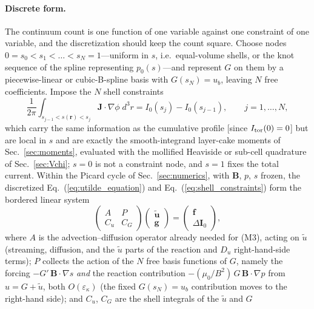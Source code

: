 \documentclass[english]{article}
\newcommand{\bB}{\mathbf{B}}
\newcommand{\bJ}{\mathbf{J}}
\newcommand{\br}{\mathbf{r}}
\begin{document}
\paragraph{Discrete form.}
The continuum count is one function of one variable against one constraint of one variable, and
the discretization should keep the count square. Choose nodes $0=s_0<s_1<\dots<s_N=1$---uniform
in $s$, i.e.\ equal-volume shells, or the knot sequence of the spline representing $p_0(s)$---and
represent $G$ on them by a piecewise-linear or cubic-B-spline basis with $G(s_N)=u_b$, leaving $N$
free coefficients. Impose the $N$ shell constraints
\begin{equation}
\frac{1}{2\pi}\int_{s_{j-1}<s(\br)<s_j}\bJ\cdot\nabla\phi\;d^{3}r
=I_0(s_j)-I_0(s_{j-1}),\qquad j=1,\dots,N ,
\label{eq:shell_constraints}
\end{equation}
which carry the same information as the cumulative profile [since $I_{\rm tor}(0)=0$] but are
local in $s$ and are exactly the smooth-integrand layer-cake moments of Sec.~\ref{sec:moments},
evaluated with the mollified Heaviside or sub-cell quadrature of Sec.~\ref{sec:Vchi}; $s=0$ is not
a constraint node, and $s=1$ fixes the total current. Within the Picard cycle of
Sec.~\ref{sec:numerics}, with $\bB$, $p$, $s$ frozen, the discretized Eq.~(\ref{eq:utilde_equation})
and Eq.~(\ref{eq:shell_constraints}) form the bordered linear system
\begin{equation}
\begin{pmatrix}A&P\\ C_u&C_G\end{pmatrix}
\begin{pmatrix}\tilde{\mathbf u}\\ \mathbf g\end{pmatrix}
=\begin{pmatrix}\mathbf f\\ \Delta\mathbf I_0\end{pmatrix},
\label{eq:bordered}
\end{equation}
where $A$ is the advection--diffusion operator already needed for (M3), acting on $\tilde u$
(streaming, diffusion, and the $\tilde u$ parts of the reaction and $D_u$ right-hand-side terms);
$P$ collects the action of the $N$ free basis functions of $G$, namely the forcing
$-G'\,\bB\cdot\nabla s$ \emph{and} the reaction contribution $-(\mu_0/B^{2})\,G\,\bB\cdot\nabla p$
from $u=G+\tilde u$, both $O(\varepsilon_\kappa)$ (the fixed $G(s_N)=u_b$ contribution moves to
the right-hand side); and $C_u$, $C_G$ are the shell integrals of the $\tilde u$ and $G$
\end{document}

